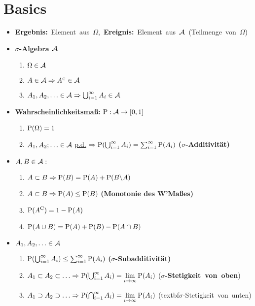 \section{Basics}

\begin{itemize}

\item \mbox{\textbf{Ergebnis:} Element aus $\Omega$, 
\textbf{Ereignis: } Element aus $\A$ (Teilmenge von $\Omega$)}

\item \textbf{$\sigma$-Algebra $\A$}
	\begin{enumerate}
	\item $\Omega\in\A$
	\item $A\in\A \Rightarrow \compl{A}\in\A$
	\item $A_1, A_2,\ldots\in\A \Rightarrow \bigcup_{i=1}^{\infty} A_i \in\A$
	\end{enumerate}
	
\item \textbf{Wahrscheinlichkeitsmaß:} $\P:\A\rightarrow [0,1]$
	\begin{enumerate}
	\item $\P(\Omega)=1$
	\item $A_1,A_2;\ldots\in\A$ \underline{p.d.} 
	$\Rightarrow \P(\bigcup_{i=1}^{\infty} A_i)
	= \sum_{i=1}^{\infty}\P(A_i)$ \quad\textbf{($\sigma$-Additivität)}
	\end{enumerate}

\item $A,B\in\A:$
	\begin{enumerate}
	\item $A\subset B \Rightarrow \P(B)=\P(A)+\P(B\backslash A)$
	\item $A\subset B \Rightarrow \P(A)\leq\P(B)$ \qquad\textbf{(Monotonie des W'Maßes)}
	\item $\P(A^{\text{C}})=1-\P(A)$
	\item $\P(A\cup B) = \P(A)+\P(B)-\P(A\cap B)$
	\end{enumerate}
	
\item $A_1,A_2,\ldots\in\A$
	\begin{enumerate}
	\item $\P(\bigcup_{i=1}^{\infty} A_i)\leq\sum_{i=1}^{\infty} \P(A_i)$ 
	\qquad\textbf{($\sigma$-Subadditivität)}
	\item $A_1\subset A_2\subset\ldots \Rightarrow 
	\P(\bigcup_{i=1}^{\infty} A_i)=\lim\limits_{i\to\infty} \P(A_i)$
	\mbox{(\textbf{$\sigma$-Stetigkeit von oben})}
	\item $A_1 \supset A_2\supset\ldots \Rightarrow
	\P(\bigcap_{i=1}^{\infty} A_i)=\lim\limits_{i\to\infty} \P(A_i)$
	\mbox{(textbf{$\sigma$-Stetigkeit von unten})}
	\end{enumerate}


\end{itemize}
